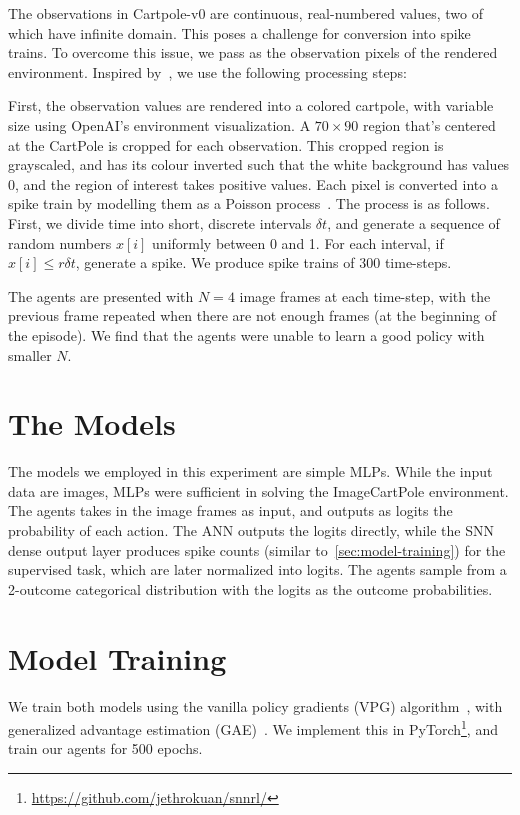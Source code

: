 \documentclass[fyp]{socreport}
\begin{document}
The observations in Cartpole-v0 are continuous, real-numbered values, two of
which have infinite domain. This poses a challenge for conversion into spike
trains. To overcome this issue, we pass as the observation pixels of the
rendered environment. Inspired by~\cite{mnih2013playing}, we use the following
processing steps:

First, the observation values are rendered into a colored cartpole, with
variable size using OpenAI's environment visualization. A $70 \times 90$ region
that's centered at the CartPole is cropped for each observation. This cropped
region is grayscaled, and has its colour inverted such that the white background
has values 0, and the region of interest takes positive values. Each pixel is
converted into a spike train by modelling them as a Poisson
process~\cite{heeger2000poisson}. The process is as follows. First, we divide
time into short, discrete intervals \(\delta t\), and generate a sequence of
random numbers \(x[i]\) uniformly between 0 and 1. For each interval, if
\(x[i] \le r \delta t\), generate a spike. We produce spike trains of 300
time-steps.

The agents are presented with $N = 4$ image frames at each time-step, with the
previous frame repeated when there are not enough frames (at the beginning of
the episode). We find that the agents were unable to learn a good policy with
smaller $N$.

\section{The Models}

The models we employed in this experiment are simple MLPs. While the input data
are images, MLPs were sufficient in solving the ImageCartPole environment. The
agents takes in the image frames as input, and outputs as logits the probability
of each action. The ANN outputs the logits directly, while the SNN dense output
layer produces spike counts (similar to~\autoref{sec:model-training}) for the
supervised task, which are later normalized into logits. The agents sample from
a 2-outcome categorical distribution with the logits as the outcome
probabilities.

\section{Model Training}

We train both models using the vanilla policy gradients (VPG)
algorithm~\cite{schulman2016optimizing}, with generalized advantage estimation
(GAE)~\cite{schulman2015high}. We implement this in
PyTorch\footnote{\url{https://github.com/jethrokuan/snnrl/}}, and train our
agents for 500 epochs.
\end{document}
